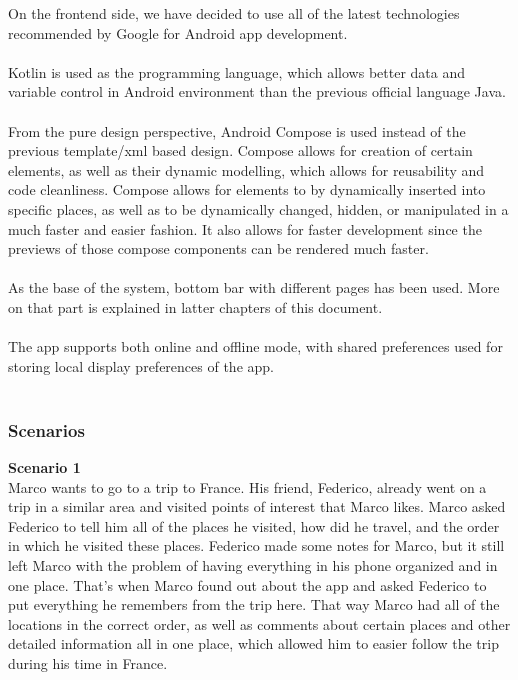 On the frontend side, we have decided to use all of the latest technologies recommended by Google for Android app development. \\ \\
Kotlin is used as the programming language, which allows better data and variable control in Android environment than the previous official language Java.\\ \\
From the pure design perspective, Android Compose is used instead of the previous template/xml based design. Compose allows for creation of certain elements, as well as their dynamic modelling, which allows for reusability and code cleanliness. Compose allows for elements to by dynamically inserted into specific places, as well as to be dynamically changed, hidden, or manipulated in a much faster and easier fashion. It also allows for faster development since the previews of those compose components can be rendered much faster.\\ \\
As the base of the system, bottom bar with different pages has been used. More on that part is explained in latter chapters of this document.
\\ \\ 
The app supports both online and offline mode, with shared preferences used for storing local display preferences of the app.\\ \\
\newpage

\subsubsection{Scenarios}

\textbf{Scenario 1}\\

\hspace{\parindent}Marco wants to go to a trip to France. His friend, Federico, already went on a trip in a similar area and visited points of interest that Marco likes. Marco asked Federico to tell him all of the places he visited, how did he travel, and the order in which he visited these places. Federico made some notes for Marco, but it still left Marco with the problem of having everything in his phone organized and in one place. That's when Marco found out about the app and asked Federico to put everything he remembers from the trip here. That way Marco had all of the locations in the correct order, as well as comments about certain places and other detailed information all in one place, which allowed him to easier follow the trip during his time in France.\\

